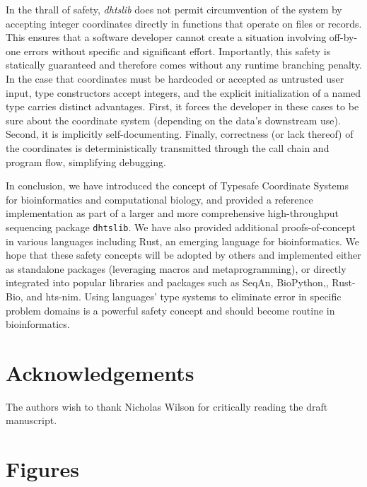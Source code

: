 \documentclass[12pt]{article}
\begin{document}
In the thrall of safety, \textit{dhtslib} does not permit circumvention of the system by accepting integer coordinates directly in functions that operate on files or records. This ensures that a software developer cannot create a situation involving off-by-one errors without specific and significant effort. Importantly, this safety is statically guaranteed and therefore comes without any runtime branching penalty. In the case that coordinates must be hardcoded or accepted as untrusted user input, type constructors accept integers, and the explicit initialization of a named type carries distinct advantages. First, it forces the developer in these cases to be sure about the coordinate system (depending on the data’s downstream use). Second, it is implicitly self-documenting. Finally, correctness (or lack thereof) of the coordinates is deterministically transmitted through the call chain and program flow, simplifying debugging.

In conclusion, we have introduced the concept of Typesafe Coordinate Systems for bioinformatics and computational biology, and provided a reference implementation as part of a larger and more comprehensive high-throughput sequencing package \texttt{dhtslib}. We have also provided additional proofs-of-concept in various languages including Rust, an emerging language for bioinformatics. We hope that these safety concepts will be adopted by others and implemented either as standalone packages (leveraging macros and metaprogramming), or directly integrated into popular libraries and packages such as SeqAn,\cite{reinert_seqan_2017} BioPython,\cite{cock_biopython_2009}, Rust-Bio,\cite{koster_rust-bio_2016} and hts-nim.\cite{pedersen_hts-nim_2018} Using languages' type systems to eliminate error in specific problem domains is a powerful safety concept and should become routine in bioinformatics.



\section*{Acknowledgements} %

The authors wish to thank Nicholas Wilson for critically reading the draft manuscript.

\newpage
\printbibliography

\newpage
\section*{Figures}
\end{document}
